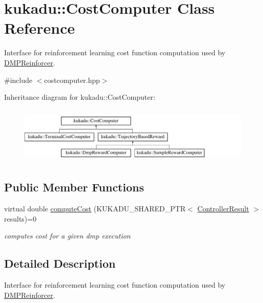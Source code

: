 \hypertarget{classkukadu_1_1CostComputer}{\section{kukadu\-:\-:Cost\-Computer Class Reference}
\label{classkukadu_1_1CostComputer}
}


Interface for reinforcement learning cost function computation used by \hyperlink{classkukadu_1_1DMPReinforcer}{D\-M\-P\-Reinforcer}.  




{\ttfamily \#include $<$costcomputer.\-hpp$>$}

Inheritance diagram for kukadu\-:\-:Cost\-Computer\-:\begin{figure}[H]
\begin{center}
\leavevmode
\includegraphics[height=2.745098cm]{classkukadu_1_1CostComputer}
\end{center}
\end{figure}
\subsection*{Public Member Functions}
\begin{DoxyCompactItemize}
\item 
virtual double \hyperlink{classkukadu_1_1CostComputer_a8d02974e1f097ac0451f03f535843175}{compute\-Cost} (K\-U\-K\-A\-D\-U\-\_\-\-S\-H\-A\-R\-E\-D\-\_\-\-P\-T\-R$<$ \hyperlink{classkukadu_1_1ControllerResult}{Controller\-Result} $>$ results)=0
\begin{DoxyCompactList}\small\item\em computes cost for a given dmp execution \end{DoxyCompactList}\end{DoxyCompactItemize}


\subsection{Detailed Description}
Interface for reinforcement learning cost function computation used by \hyperlink{classkukadu_1_1DMPReinforcer}{D\-M\-P\-Reinforcer}. 

